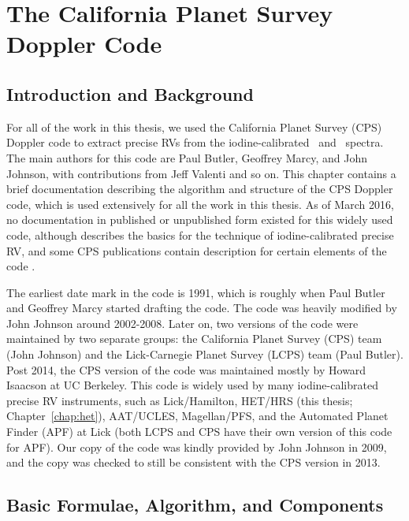 \chapter{The California Planet Survey Doppler
  Code}\label{chap:doppler} 

\section{Introduction and Background}

For all of the work in this thesis, we used the California Planet
Survey (CPS) Doppler code to extract precise RVs from the
iodine-calibrated \het\ and \keck\ spectra. The main authors for this
code are Paul Butler, Geoffrey Marcy, and John Johnson, with
contributions from Jeff Valenti and so on. This chapter contains a
brief documentation describing the algorithm and structure of the CPS
Doppler code, which is used extensively for all the work in this
thesis. As of March 2016, no documentation in published or unpublished
form existed for this widely used code, although \cite{butler1996}
describes the basics for the technique of iodine-calibrated precise
RV, and some CPS publications contain description for certain elements
of the code \citep[e.g.,][]{2006ApJ...647..600J, 2009ApJ...696...75H,
2011ApJ...726...73H, 2011ApJS..197...26J}.

The earliest date mark in the code is 1991, which is roughly when Paul
Butler and Geoffrey Marcy started drafting the code. The code was
heavily modified by John Johnson around 2002-2008. Later on, two
versions of the code were maintained by two separate groups: the
California Planet Survey (CPS) team (John Johnson) and the
Lick-Carnegie Planet Survey (LCPS) team (Paul Butler). Post 2014, the
CPS version of the code was maintained mostly by Howard Isaacson at UC
Berkeley. This code is widely used by many iodine-calibrated precise
RV instruments, such as Lick/Hamilton, HET/HRS (this thesis;
Chapter~\ref{chap:het}), AAT/UCLES, Magellan/PFS, and the Automated
Planet Finder (APF) at Lick (both LCPS and CPS have their own version
of this code for APF). Our copy of the code was kindly provided by
John Johnson in 2009, and the copy was checked to still be consistent
with the CPS version in 2013.


\section{Basic Formulae, Algorithm, and Components}

